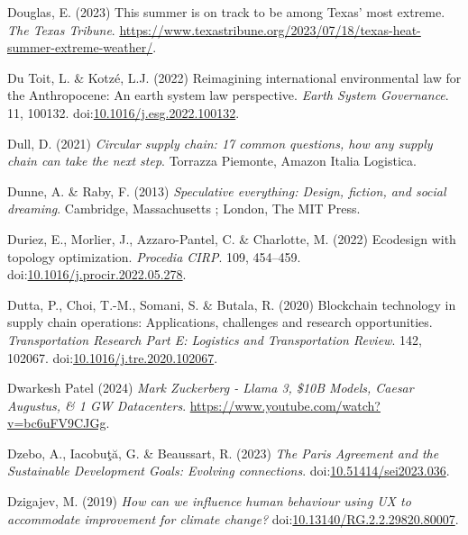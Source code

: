 \documentclass[
  letterpaper,
  DIV=11,
  numbers=noendperiod]{scrartcl}
\newlength{\cslhangindent}
\newenvironment{CSLReferences}[2] %
 {\begin{list}{}{%
  \setlength{\itemindent}{0pt}
  \setlength{\leftmargin}{0pt}
  \setlength{\parsep}{0pt}
  \ifodd #1
   \setlength{\leftmargin}{\cslhangindent}
   \setlength{\itemindent}{-1\cslhangindent}
  \fi
  \setlength{\itemsep}{#2\baselineskip}}}
 {\end{list}}
\begin{document}
\begin{CSLReferences}{0}{1}
Douglas, E. (2023) This summer is on track to be among {Texas}' most
extreme. \emph{The Texas Tribune}.
\url{https://www.texastribune.org/2023/07/18/texas-heat-summer-extreme-weather/}.

Du Toit, L. \& Kotzé, L.J. (2022) Reimagining international
environmental law for the {Anthropocene}: {An} earth system law
perspective. \emph{Earth System Governance}. 11, 100132.
doi:\href{https://doi.org/10.1016/j.esg.2022.100132}{10.1016/j.esg.2022.100132}.

Dull, D. (2021) \emph{Circular supply chain: 17 common questions, how
any supply chain can take the next step}. Torrazza Piemonte, Amazon
Italia Logistica.

Dunne, A. \& Raby, F. (2013) \emph{Speculative everything: Design,
fiction, and social dreaming}. Cambridge, Massachusetts ; London, The
MIT Press.

Duriez, E., Morlier, J., Azzaro-Pantel, C. \& Charlotte, M. (2022)
Ecodesign with topology optimization. \emph{Procedia CIRP}. 109,
454--459.
doi:\href{https://doi.org/10.1016/j.procir.2022.05.278}{10.1016/j.procir.2022.05.278}.

Dutta, P., Choi, T.-M., Somani, S. \& Butala, R. (2020) Blockchain
technology in supply chain operations: {Applications}, challenges and
research opportunities. \emph{Transportation Research Part E: Logistics
and Transportation Review}. 142, 102067.
doi:\href{https://doi.org/10.1016/j.tre.2020.102067}{10.1016/j.tre.2020.102067}.

Dwarkesh Patel (2024) \emph{Mark {Zuckerberg} - {Llama} 3, \${10B
Models}, {Caesar Augustus}, \& 1 {GW Datacenters}}.
\url{https://www.youtube.com/watch?v=bc6uFV9CJGg}.

Dzebo, A., Iacobuţă, G. \& Beaussart, R. (2023) \emph{The {Paris
Agreement} and the {Sustainable Development Goals}: Evolving
connections}.
doi:\href{https://doi.org/10.51414/sei2023.036}{10.51414/sei2023.036}.

Dzigajev, M. (2019) \emph{How can we influence human behaviour using
{UX} to accommodate improvement for climate change?}
doi:\href{https://doi.org/10.13140/RG.2.2.29820.80007}{10.13140/RG.2.2.29820.80007}.


\end{CSLReferences}
\end{document}
